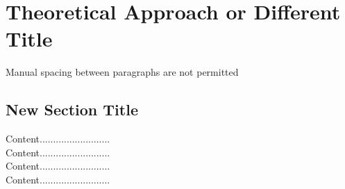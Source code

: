
\chapter{Theoretical Approach or Different Title}

\begin{justify}
    Manual spacing between paragraphs are not permitted 
\end{justify}

\section{New Section Title}
\begin{justify}

    Content..........................\\
    Content..........................\\
    Content..........................\\
    Content..........................
    
\end{justify}

